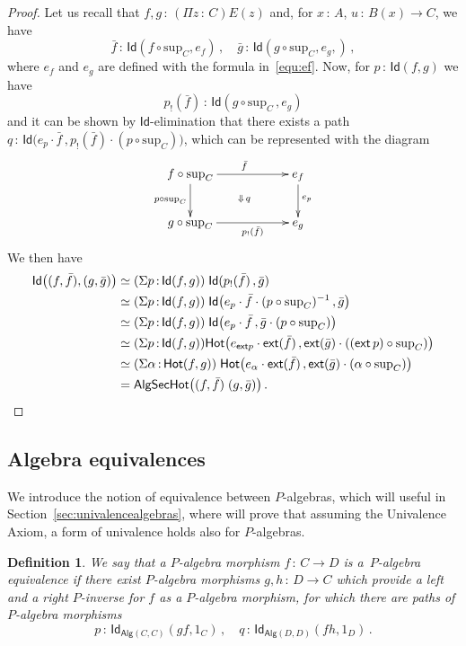 \documentclass[10pt,a4paper,oneside,reqno]{amsart}
\numberwithin{equation}{section}
\theoremstyle{mythm}
\theoremstyle{mydef}
\newtheorem{definition}[theorem]{Definition}
\theoremstyle{myrmk}
\newcommand{\ie}{\text{i.e.\ }}
\newcommand{\co}{\,{:}\,}
\newcommand{\ct}{\cdot}
\newcommand{\Hot}{\mathsf{Hot}}
\newcommand{\ext}{\mathsf{ext}}
\newcommand{\Id}{\mathsf{Id}}
\newcommand{\Palg}{\mathsf{Alg}}
\renewcommand{\sup}{\mathrm{sup}}
\newcommand{\AlgSecHot}{\mathsf{AlgSecHot}}
\begin{document}
\begin{proof} Let us recall that $f, g \co (\Pi z \co C) E(z)$ and, for $x \co A$, $u \co B(x) \to C$, 
we have
\[
\bar{f} \co  \Id(f \circ \sup_C , e_f  ) \, , \quad
\bar{g}\co  \Id( g \circ \sup_C , e_g, )  \, ,
\]
where $e_f$ and $e_g$ are defined with the formula in~\eqref{equ:ef}. 
Now, for $p \co \Id(f, g)$ we have 
\[
p_{!}(\bar{f}) \co  \Id( g \circ \sup_C \, , e_g)
\] 
and it can be shown by $\Id$-elimination that there exists a path 
$q  \co \Id\big(  e_p \ct \bar{f}   \, ,  p_{!}(\bar{f})  \ct  (p \circ \sup_C)    \big)$, 
which can be represented with the diagram
\[
\xymatrix@C=2cm{
f \circ \sup_C  \ar[d]_-{p \circ \sup_C}  \ar[r]^{\bar{f}}  \ar@{}[dr]|{\Downarrow \, q } & e_f 
\ar[d]^{ e_p}  \\
 g \circ \sup_C \ar[r]_-{ p_{!}(\bar{f}) }  & e_g    }
\]
We then have
\begin{align*}
  \Id\big( (f,\bar{f}),  (g,\bar{g}) \big) 
& \simeq (\Sigma p \co \Id( f , g)) \; \Id ( p_{!} ( \bar{f} ) \, , \bar{g}  )  \\
& \simeq (\Sigma p \co \Id( f, g)) 
\; \Id\big(  
e_p \ct  \bar{f} \ct (p \circ \sup_C)^{-1} \, , \bar{g}     \big)   \\ 
& \simeq (\Sigma p \co \Id( f, g)) 
\; \Id\big( e_p  \ct \bar{f} \, ,   \bar{g} \ct ( p \circ \sup_C)   \big)   \\ 
& \simeq (\Sigma p \co \Id( f, g)) 
\Hot\big(  e_{\ext p} \ct \ext( \bar{f}) \, , 
 \ext( \bar{g}) \ct ( (\ext \, p) \circ \sup_C)   \big)  \\ 
&  \simeq (\Sigma \alpha \co \Hot( f, g)) \; 
\Hot\big(  e_\alpha \ct \ext( \bar{f}) \, , 
 \ext( \bar{g}) \ct (\alpha \circ \sup_C)   \big)  \\
&  =   \AlgSecHot \big( (f,\bar{f}) \; (g,\bar{g}) \big) \, . \qedhere
\end{align*}  
\end{proof}



\subsection{Algebra equivalences}  We introduce the notion of equivalence between $P$-algebras, which
will useful in Section~\ref{sec:univalencealgebras}, where will prove that assuming the Univalence Axiom, a form of univalence holds also for $P$-algebras. 



\begin{definition}  
We say that a $P$-algebra morphism $f \co C \to D$ is 
 a~\emph{$P$-algebra equivalence}
if there exist $P$-algebra morphisms $g, h \co D \to C$  which provide a left and a right $P$-inverse for $f$ as a
$P$-algebra morphism, \ie for
which there are paths of $P$-algebra morphisms
\[ 
p \co \Id_{\Palg(C,C)}( g  f,  1_C) \, , \quad q \co \Id_{\Palg(D,D)}( f h , 1_D) \, .
\]
\end{definition}
 
\end{document}
